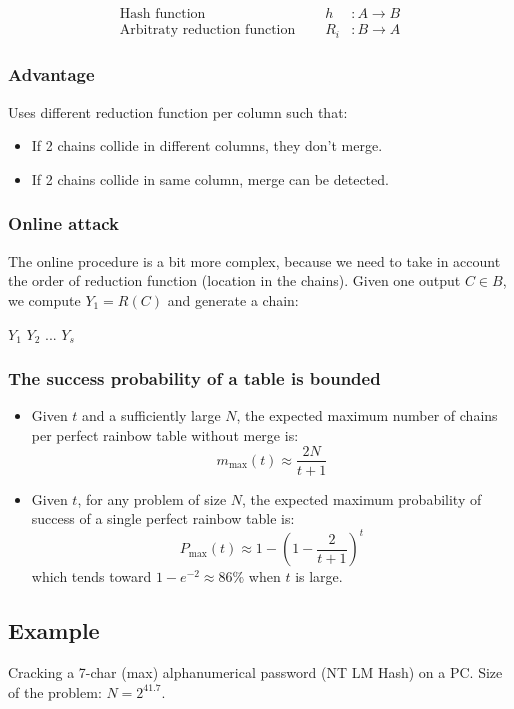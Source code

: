 \begin{eqnarray*}
    \textrm{Hash function } \quad & h &: A \to B \\
    \textrm{Arbitraty reduction function } \quad & R_i &: B \to A 
\end{eqnarray*}

\subsubsection{Advantage}
Uses different reduction function per column such that:
\begin{itemize}
    \item If 2 chains collide in different columns, they don't merge.
    \item If 2 chains collide in same column, merge can be detected.
\end{itemize}

\subsubsection{Online attack}
The online procedure is a bit more complex, because we need to take in
account the order of reduction function (location in the chains).
Given one output $C \in B$, we compute $Y_1 = R(C)$ and generate a
chain: 
\begin{center}
    $Y_1$  $Y_2$  ...  $Y_s $
\end{center}


\subsubsection{The success probability of a table is bounded}
\begin{itemize}
    \item
        Given $t$ and a sufficiently large $N$, the expected maximum number of
        chains per perfect rainbow table without merge is:
        $$ m_{\max}(t)\approx\frac{2N}{t+1} $$
    \item
        Given $t$, for any problem of size $N$, the expected maximum probability of
        success of a single perfect rainbow table is:
        $$ P_{\max}(t)\approx 1 - (1-\frac{2}{t+1})^t $$
        which tends toward $ 1 - e^{-2}\approx 86\% $ when $t$ is large.

\end{itemize}

\subsection{Example}
Cracking a 7-char (max) alphanumerical password (NT LM Hash)
on a PC. Size of the problem: $N = 2^{41.7}$.

